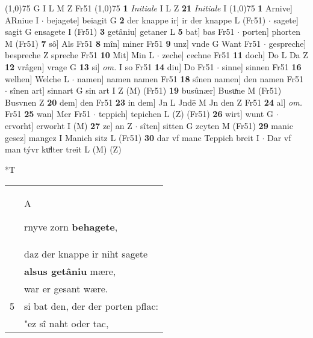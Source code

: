 \documentclass[8pt,a4paper,notitlepage]{article}
\begin{document}
\begin{table}[ht]
\begin{minipage}[t]{0.5\linewidth}
\begin{tabular}{rl}
\end{tabular}
\scriptsize
\line(1,0){75} \newline
G I L M Z Fr51 \newline
\line(1,0){75} \newline
\textbf{1} \textit{Initiale} I L Z  \textbf{21} \textit{Initiale} I  \newline
\line(1,0){75} \newline
\textbf{1} Arnive] ARniue I  $\cdot$ bejagete] beiagit G \textbf{2} der knappe ir] ir der knappe L (Fr51)  $\cdot$ sagete] sagit G ensagete I (Fr51) \textbf{3} getâniu] getaner L \textbf{5} bat] bas Fr51  $\cdot$ porten] phorten M (Fr51) \textbf{7} sô] Als Fr51 \textbf{8} mîn] miner Fr51 \textbf{9} unz] vnde G Want Fr51  $\cdot$ gespreche] bespreche Z spreche Fr51 \textbf{10} Mit] Min L  $\cdot$ zeche] cechne Fr51 \textbf{11} doch] Do L Da Z \textbf{12} vrâgen] vrage G \textbf{13} si] \textit{om.} I so Fr51 \textbf{14} diu] Do Fr51  $\cdot$ sinne] sinnen Fr51 \textbf{16} welhen] Welche L  $\cdot$ namen] namen namen Fr51 \textbf{18} sînen namen] den namen Fr51  $\cdot$ sînen art] sinnart G sin art I Z (M) (Fr51) \textbf{19} busûnær] Busuͯne M (Fr51) Busvnen Z \textbf{20} dem] den Fr51 \textbf{23} in dem] Jn L Jndē M Jn den Z Fr51 \textbf{24} al] \textit{om.} Fr51 \textbf{25} wan] Mer Fr51  $\cdot$ teppich] tepichen L (Z) (Fr51) \textbf{26} wirt] wunt G  $\cdot$ ervorht] erworht I (M) \textbf{27} ze] an Z  $\cdot$ sîten] sitten G zcyten M (Fr51) \textbf{29} manic gesez] mangez I Manich sitz L (Fr51) \textbf{30} dar vf manc Teppich breit I  $\cdot$ Dar vf man tývr kuͯlter treit L (M) (Z) \newline
\end{minipage}
\hspace{0.5cm}
\begin{minipage}[t]{0.5\linewidth}
\small
\begin{center}*T
\end{center}
\begin{tabular}{rl}
 & \begin{large}A\end{large}rnyve zorn \textbf{behagete},\\ 
 & daz der knappe ir niht sagete\\ 
 & \textbf{alsus getâniu} mære,\\ 
 & war er gesant wære.\\ 
5 & si bat den, der der porten pflac:\\ 
 & "ez sî naht oder tac,\\ 

\end{tabular}
\end{minipage}
\end{table}
\end{document}
